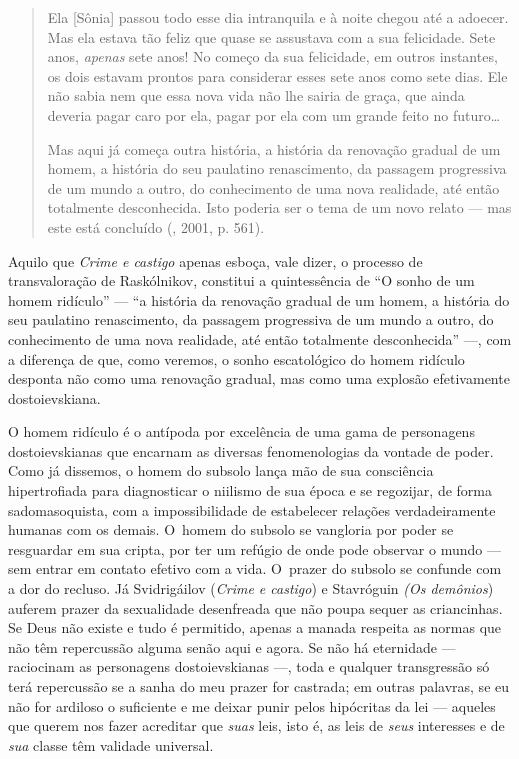 \begin{quote}
Ela {[}Sônia{]} passou todo esse dia intranquila e à noite chegou até a
adoecer. Mas ela estava tão feliz que quase se assustava com a sua
felicidade. Sete anos, \emph{apenas} sete anos! No começo da sua
felicidade, em outros instantes, os dois estavam prontos para considerar
esses sete anos como sete dias. Ele não sabia nem que essa nova vida não
lhe sairia de graça, que ainda deveria pagar caro por ela, pagar por ela
com um grande feito no futuro\ldots

\noindent Mas aqui já começa outra história, a história da renovação gradual de um
homem, a história do seu paulatino renascimento, da passagem progressiva
de um mundo a outro, do conhecimento de uma nova realidade, até então
totalmente desconhecida. Isto poderia ser o tema de um novo relato ---
mas este está concluído (, 2001, p. 561).
\end{quote}

Aquilo que \emph{Crime e castigo} apenas esboça, vale dizer, o processo
de transvaloração de Raskólnikov, constitui a quintessência de ``O sonho
de um homem ridículo'' --- ``a história da renovação gradual de um homem,
a história do seu paulatino renascimento, da passagem progressiva de um
mundo a outro, do conhecimento de uma nova realidade, até então
totalmente desconhecida'' ---, com a diferença de que, como veremos, o
sonho escatológico do homem ridículo desponta não como uma renovação
gradual, mas como uma explosão efetivamente dostoievskiana.

O homem ridículo é o antípoda por excelência de uma gama de personagens
dostoievskianas que encarnam as diversas fenomenologias da vontade de
poder. Como já dissemos, o homem do subsolo lança mão de sua consciência
hipertrofiada para diagnosticar o niilismo de sua época e se regozijar,
de forma sadomasoquista, com a impossibilidade de estabelecer relações
verdadeiramente humanas com os demais. O~homem do subsolo se vangloria
por poder se resguardar em sua cripta, por ter um refúgio de onde pode
observar o mundo --- sem entrar em contato efetivo com a vida. O~prazer
do subsolo se confunde com a dor do recluso. Já Svidrigáilov
(\emph{Crime e castigo}) e Stavróguin \emph{(Os demônios}) auferem
prazer da sexualidade desenfreada que não poupa sequer as criancinhas.
Se Deus não existe e tudo é permitido, apenas a manada respeita as
normas que não têm repercussão alguma senão aqui e agora. Se não há
eternidade --- raciocinam as personagens dostoievskianas ---, toda e
qualquer transgressão só terá repercussão se a sanha do meu prazer for
castrada; em outras palavras, se eu não for ardiloso o suficiente e me
deixar punir pelos hipócritas da lei --- aqueles que querem nos fazer
acreditar que \emph{suas} leis, isto é, as leis de \emph{seus}
interesses e de \emph{sua} classe têm validade universal.

